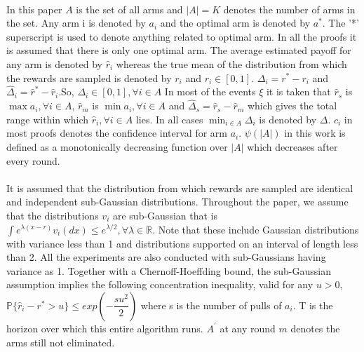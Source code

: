 \paragraph*{}In this paper $A$ is the set of all arms and $|A|=K$ denotes the number of arms in the set. Any arm i is denoted by $a_{i}$ and the optimal arm is denoted by $a^{*}$. The '*' superscript is used to denote anything related to optimal arm. In all the proofs it is assumed that there is only one optimal arm. The average estimated payoff for any arm is denoted by $\hat{r}_{i}$ whereas the true mean of the distribution from which the rewards are sampled is denoted by $r_{i}$ and $r_{i}\in[0,1]$. $\Delta_{i}=r^{*}-r_{i}$ and $\hat{\Delta}_{i}=\hat{r}^{*}-\hat{r}_{i}$.So, $\Delta_{i}\in [0,1], \forall i\in A$ In most of the events $\xi$ it is taken that $\hat{r}_{s}$ is $\max{a_{i}},\forall i \in A$, $\hat{r}_{m}$ is $\min{a_{i}},\forall i \in A$ and $\hat{\Delta}_{s}=\hat{r}_{s} - \hat{r}_{m}$ which gives the total range within which $\hat{r}_{i},\forall i\in A$ lies. In all cases $\min_{i\in A}{\Delta_{i}}$ is denoted by $\Delta$. $c_{i}$ in most proofs denotes the confidence interval for arm $a_{i}$. $\psi(|A|)$ in this work is defined as a monotonically decreasing function over $|A|$ which decreases after every round.
\paragraph*{}It is assumed that the distribution from which rewards are sampled are identical and independent sub-Gaussian distributions. Throughout the paper, we assume that the distributions $v_{i}$ are sub-Gaussian that is $\int e^{\lambda(x - r)} v_{i} (dx) ≤ e^{\lambda /2}, \forall \lambda \in \mathbb{R}$. Note that these include Gaussian distributions with variance less than 1 and distributions supported on an interval of length less than 2. All the experiments are also conducted with sub-Gaussians having variance as 1. Together with a Chernoff-Hoeffding bound, the sub-Gaussian assumption implies the following concentration inequality, valid for any
$u > 0$,
\newline
\hspace*{8em}$\mathbb{P}\lbrace \hat{r}_{i} - r^{*} > u\rbrace \leq exp(-\dfrac{su^{2}}{2}) $
\newline
where s is the number of pulls of $a_{i}$. T is the horizon over which this entire algorithm runs.  $A^{'}$ at any round $m$ denotes the arms still not eliminated.

